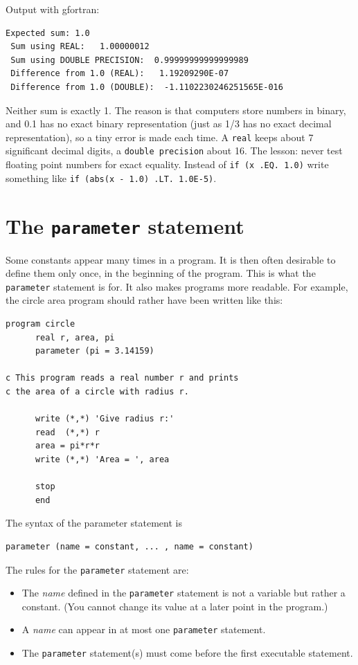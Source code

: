 Output with gfortran:

\begin{lstlisting}[style=output]
 Expected sum: 1.0
 Sum using REAL:   1.00000012
 Sum using DOUBLE PRECISION:  0.99999999999999989
 Difference from 1.0 (REAL):   1.19209290E-07
 Difference from 1.0 (DOUBLE):  -1.1102230246251565E-016
\end{lstlisting}

Neither sum is exactly 1. The reason is that computers store numbers in binary, and 0.1 has no exact binary representation (just as 1/3 has no exact decimal representation), so a tiny error is made each time. A \texttt{real} keeps about 7 significant decimal digits, a \texttt{double precision} about 16. The lesson: never test floating point numbers for exact equality. Instead of \texttt{if (x .EQ. 1.0)} write something like \texttt{if (abs(x - 1.0) .LT. 1.0E-5)}.

\section{The \texttt{parameter} statement}

Some constants appear many times in a program. It is then often desirable to define them only once, in the beginning of the program. This is what the \texttt{parameter} statement is for. It also makes programs more readable. For example, the circle area program should rather have been written like this:

\begin{lstlisting}[style=fortran77]
      program circle
      real r, area, pi
      parameter (pi = 3.14159)
 
c This program reads a real number r and prints
c the area of a circle with radius r.
 
      write (*,*) 'Give radius r:'
      read  (*,*) r
      area = pi*r*r
      write (*,*) 'Area = ', area
 
      stop
      end
\end{lstlisting}

The syntax of the parameter statement is

\begin{lstlisting}[style=fortran77]
      parameter (name = constant, ... , name = constant)
\end{lstlisting}

The rules for the \texttt{parameter} statement are:

\begin{itemize}
    \item The \emph{name} defined in the \texttt{parameter} statement is not a variable but rather a constant. (You cannot change its value at a later point in the program.)
    \item A \emph{name} can appear in at most one \texttt{parameter} statement.
    \item The \texttt{parameter} statement(s) must come before the first executable statement.
\end{itemize}

